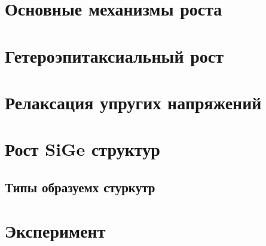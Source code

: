 \documentclass[10pt,pdf,hyperref={unicode}, dvipsnames]{beamer}
\begin{document}
\section{Основные механизмы роста}


\section{Гетероэпитаксиальный рост}


\section{Релаксация упругих напряжений}


\section{Рост SiGe структур}
\subsection{Типы образуемх стуркутр}


\section{Эксперимент}
\end{document}
